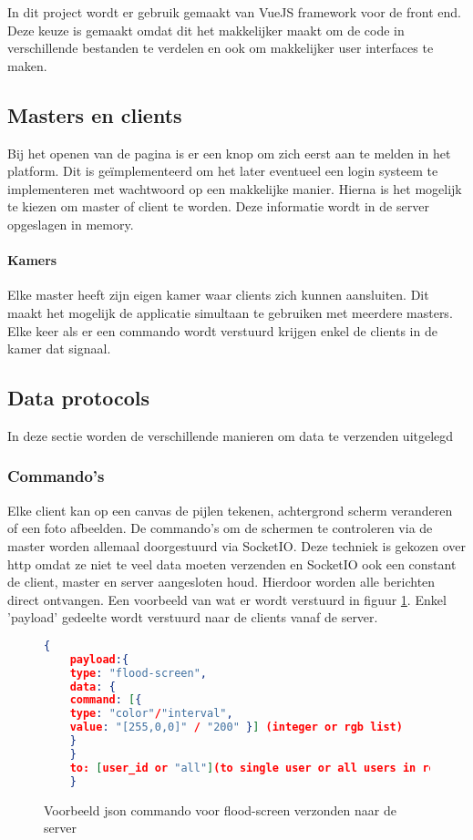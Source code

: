 In dit project wordt er gebruik gemaakt van VueJS framework voor de front end. Deze keuze is gemaakt omdat dit het makkelijker maakt om de code in verschillende bestanden te verdelen en ook om makkelijker user interfaces te maken.


\subsection{Masters en clients}
Bij het openen van de pagina is er een knop om zich eerst aan te melden in het platform. Dit is geïmplementeerd om het later eventueel een login systeem te implementeren met wachtwoord op een makkelijke manier.
Hierna is het mogelijk te kiezen om master of client te worden.
Deze informatie wordt in de server opgeslagen in memory.
\paragraph{Kamers} Elke master heeft zijn eigen kamer waar clients zich kunnen aansluiten. Dit maakt het mogelijk de applicatie simultaan te gebruiken met meerdere masters. Elke keer als er een commando wordt verstuurd krijgen enkel de clients in de kamer dat signaal.

\subsection{Data protocols}
In deze sectie worden de verschillende manieren om data te verzenden uitgelegd
\subsubsection{Commando's}
Elke client kan op een canvas de pijlen tekenen, achtergrond scherm veranderen of een foto afbeelden. De commando's om de schermen te controleren via de master worden allemaal doorgestuurd via SocketIO. Deze techniek is gekozen over http omdat ze niet te veel data moeten verzenden en SocketIO ook een constant de client, master en server aangesloten houd. Hierdoor worden alle berichten direct ontvangen. Een voorbeeld van wat er wordt verstuurd in figuur \ref{jsonScreenCommand}.
Enkel 'payload' gedeelte wordt verstuurd naar de clients vanaf de server.

\begin{figure}
    \begin{lstlisting}[language=json,firstnumber=1]
    {
    payload:{
    type: "flood-screen",
    data: {
    command: [{
    type: "color"/"interval",
    value: "[255,0,0]" / "200" }] (integer or rgb list)
    }
    }
    to: [user_id or "all"](to single user or all users in room)
    }

    \end{lstlisting}
    \caption{Voorbeeld json commando voor flood-screen verzonden naar de server} \label{jsonScreenCommand}
\end{figure}

